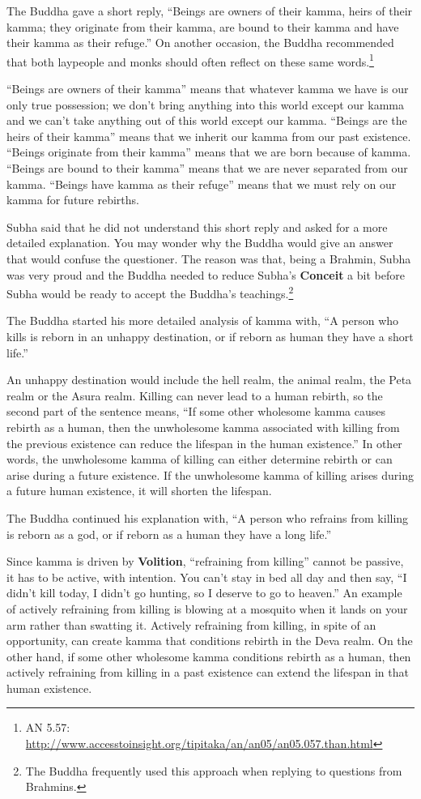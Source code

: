 The Buddha gave a short reply, “Beings are owners of their kamma, heirs of their kamma; they originate from their kamma, are bound to their kamma and have their kamma as their refuge.” On another occasion, the Buddha recommended that both laypeople and monks should often reflect on these same words.\footnote{AN 5.57: \url{http://www.accesstoinsight.org/tipitaka/an/an05/an05.057.than.html}}

“Beings are owners of their kamma” means that whatever kamma we have is our only true possession; we don’t bring anything into this world except our kamma and we can’t take anything out of this world except our kamma. “Beings are the heirs of their kamma” means that we inherit our kamma from our past existence. “Beings originate from their kamma” means that we are born because of kamma. “Beings are bound to their kamma” means that we are never separated from our kamma. “Beings have kamma as their refuge” means that we must rely on our kamma for future rebirths.

Subha said that he did not understand this short reply and asked for a more detailed explanation. You may wonder why the Buddha would give an answer that would confuse the questioner. The reason was that, being a Brahmin, Subha was very proud and the Buddha needed to reduce Subha’s \textbf{Conceit} a bit before Subha would be ready to accept the Buddha’s teachings.\footnote{The Buddha frequently used this approach when replying to questions from Brahmins.}

The Buddha started his more detailed analysis of kamma with, “A person who kills is reborn in an unhappy destination, or if reborn as human they have a short life.” 

An unhappy destination would include the hell realm, the animal realm, the Peta realm or the Asura realm. Killing can never lead to a human rebirth, so the second part of the sentence means, “If some other wholesome kamma causes rebirth as a human, then the unwholesome kamma associated with killing from the previous existence can reduce the lifespan in the human existence.” In other words, the unwholesome kamma of killing can either determine rebirth or can arise during a future existence. If the unwholesome kamma of killing arises during a future human existence, it will shorten the lifespan.

The Buddha continued his explanation with, “A person who refrains from killing is reborn as a god, or if reborn as a human they have a long life.” 

Since kamma is driven by \textbf{Volition}, “refraining from killing” cannot be passive, it has to be active, with intention. You can’t stay in bed all day and then say, “I didn’t kill today, I didn’t go hunting, so I deserve to go to heaven.” An example of actively refraining from killing is blowing at a mosquito when it lands on your arm rather than swatting it. Actively refraining from killing, in spite of an opportunity, can create kamma that conditions rebirth in the Deva realm. On the other hand, if some other wholesome kamma conditions rebirth as a human, then actively refraining from killing in a past existence can extend the lifespan in that human existence.

